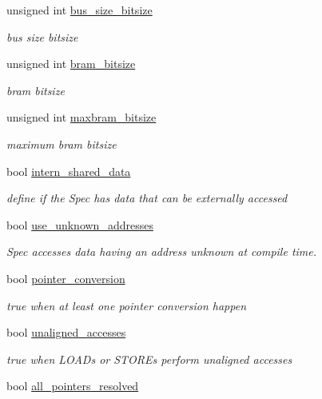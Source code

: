 \begin{DoxyCompactItemize}
unsigned int \hyperlink{classmemory_adb91a01d972a23757d764578d6b36f7e}{bus\+\_\+size\+\_\+bitsize}
\begin{DoxyCompactList}\small\item\em bus size bitsize \end{DoxyCompactList}\item 
unsigned int \hyperlink{classmemory_a8ce0f5cb063649425c36d630446cbdab}{bram\+\_\+bitsize}
\begin{DoxyCompactList}\small\item\em bram bitsize \end{DoxyCompactList}\item 
unsigned int \hyperlink{classmemory_a06a2006636c058647483276947faaede}{maxbram\+\_\+bitsize}
\begin{DoxyCompactList}\small\item\em maximum bram bitsize \end{DoxyCompactList}\item 
bool \hyperlink{classmemory_a85abaa2319b6f0941e1448bb53c57958}{intern\+\_\+shared\+\_\+data}
\begin{DoxyCompactList}\small\item\em define if the Spec has data that can be externally accessed \end{DoxyCompactList}\item 
bool \hyperlink{classmemory_a0b0d3f30b23b5bbb388097f3c117d29e}{use\+\_\+unknown\+\_\+addresses}
\begin{DoxyCompactList}\small\item\em Spec accesses data having an address unknown at compile time. \end{DoxyCompactList}\item 
bool \hyperlink{classmemory_ac4763c40921f38e1e1e7eda3acb4e0af}{pointer\+\_\+conversion}
\begin{DoxyCompactList}\small\item\em true when at least one pointer conversion happen \end{DoxyCompactList}\item 
bool \hyperlink{classmemory_a501c57d0c361729baebefcf365fc3241}{unaligned\+\_\+accesses}
\begin{DoxyCompactList}\small\item\em true when L\+O\+A\+Ds or S\+T\+O\+R\+Es perform unaligned accesses \end{DoxyCompactList}\item 
bool \hyperlink{classmemory_a5baad078a5d727ffd398b13f38bea29d}{all\+\_\+pointers\+\_\+resolved}

\end{DoxyCompactItemize}
